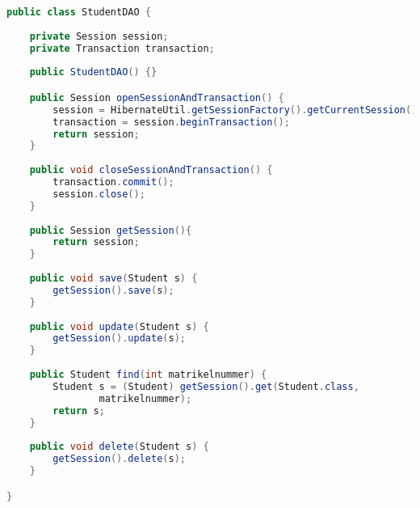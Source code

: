 \hspace{0pt}
\begin{lstlisting}[language=Java]
public class StudentDAO {
	
	private Session session;
	private Transaction transaction;
	
	public StudentDAO() {} 

	public Session openSessionAndTransaction() {
		session = HibernateUtil.getSessionFactory().getCurrentSession();
		transaction = session.beginTransaction();
		return session;
	}
	
	public void closeSessionAndTransaction() {
		transaction.commit();
		session.close();
	}
	
	public Session getSession(){
		return session;
	}
	
	public void save(Student s) {
		getSession().save(s);
	}
	
	public void update(Student s) {
		getSession().update(s);
	}
	
	public Student find(int matrikelnummer) {
		Student s = (Student) getSession().get(Student.class, 
				matrikelnummer);
		return s;
	}
	
	public void delete(Student s) {
		getSession().delete(s);
	}

}

\end{lstlisting}
